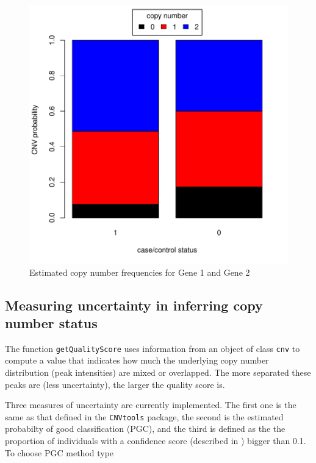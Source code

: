 \documentclass[11pt]{article}
\begin{document}
\begin{figure}[ht]
\begin{center}
\includegraphics{CNVassoc_vignette-021}
\caption{\small Estimated copy number frequencies for Gene 1 and Gene 2}
\label{fig-MLPAcnvprob}
\end{center}
\end{figure}


\clearpage



\subsection{Measuring uncertainty in inferring copy number status}


The function \texttt{getQualityScore} uses information from an object of class {\tt cnv} to compute a value that indicates how much 
the underlying copy number distribution (peak intensities) are mixed or overlapped. The more separated these peaks are (less uncertainty), 
the larger the quality score is.

Three measures of uncertainty are currently implemented. The first one is the same as that defined in the \texttt{CNVtools} package, the second
is the estimated probabilty of good classification (PGC), and the third is defined as the the proportion of individuals with a confidence 
score (described in \cite{canary}) bigger than 0.1. \\
To choose PGC method type
%
\end{document}

